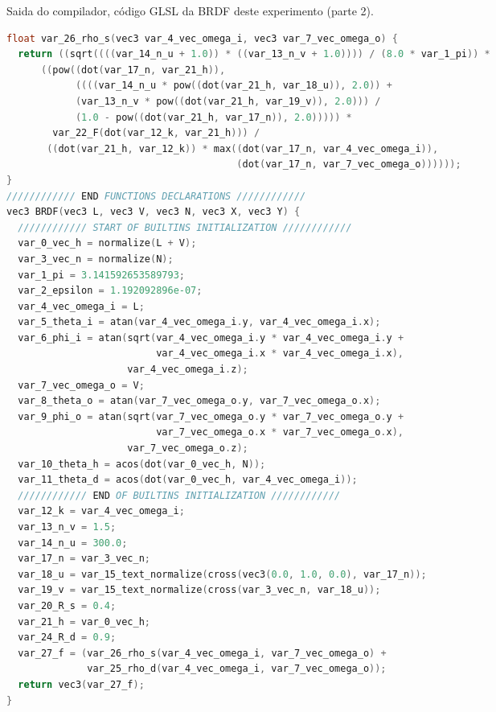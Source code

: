 \begin{codigo}[H]
    \caption{\small Saida do compilador, código GLSL da BRDF deste experimento  (parte 2). }
    \label{cod-ashikhmin-shirley-close-to-original-glsl-pt-2}
\begin{lstlisting}[language=C, inputencoding=utf8]
float var_26_rho_s(vec3 var_4_vec_omega_i, vec3 var_7_vec_omega_o) {
  return ((sqrt((((var_14_n_u + 1.0)) * ((var_13_n_v + 1.0)))) / (8.0 * var_1_pi)) *
      ((pow((dot(var_17_n, var_21_h)),
            ((((var_14_n_u * pow((dot(var_21_h, var_18_u)), 2.0)) +
            (var_13_n_v * pow((dot(var_21_h, var_19_v)), 2.0))) /
            (1.0 - pow((dot(var_21_h, var_17_n)), 2.0))))) *
        var_22_F(dot(var_12_k, var_21_h))) /
       ((dot(var_21_h, var_12_k)) * max((dot(var_17_n, var_4_vec_omega_i)),
                                        (dot(var_17_n, var_7_vec_omega_o))))));
}
//////////// END FUNCTIONS DECLARATIONS ////////////
vec3 BRDF(vec3 L, vec3 V, vec3 N, vec3 X, vec3 Y) {
  //////////// START OF BUILTINS INITIALIZATION ////////////
  var_0_vec_h = normalize(L + V);
  var_3_vec_n = normalize(N);
  var_1_pi = 3.141592653589793;
  var_2_epsilon = 1.192092896e-07;
  var_4_vec_omega_i = L;
  var_5_theta_i = atan(var_4_vec_omega_i.y, var_4_vec_omega_i.x);
  var_6_phi_i = atan(sqrt(var_4_vec_omega_i.y * var_4_vec_omega_i.y +
                          var_4_vec_omega_i.x * var_4_vec_omega_i.x),
                     var_4_vec_omega_i.z);
  var_7_vec_omega_o = V;
  var_8_theta_o = atan(var_7_vec_omega_o.y, var_7_vec_omega_o.x);
  var_9_phi_o = atan(sqrt(var_7_vec_omega_o.y * var_7_vec_omega_o.y +
                          var_7_vec_omega_o.x * var_7_vec_omega_o.x),
                     var_7_vec_omega_o.z);
  var_10_theta_h = acos(dot(var_0_vec_h, N));
  var_11_theta_d = acos(dot(var_0_vec_h, var_4_vec_omega_i));
  //////////// END OF BUILTINS INITIALIZATION ////////////
  var_12_k = var_4_vec_omega_i;
  var_13_n_v = 1.5;
  var_14_n_u = 300.0;
  var_17_n = var_3_vec_n;
  var_18_u = var_15_text_normalize(cross(vec3(0.0, 1.0, 0.0), var_17_n));
  var_19_v = var_15_text_normalize(cross(var_3_vec_n, var_18_u));
  var_20_R_s = 0.4;
  var_21_h = var_0_vec_h;
  var_24_R_d = 0.9;
  var_27_f = (var_26_rho_s(var_4_vec_omega_i, var_7_vec_omega_o) +
              var_25_rho_d(var_4_vec_omega_i, var_7_vec_omega_o));
  return vec3(var_27_f);
}
\end{lstlisting}
\end{codigo}

